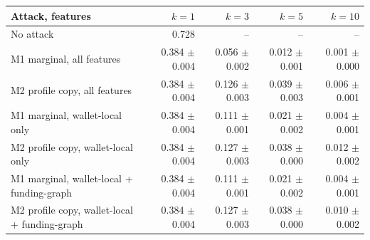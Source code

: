 \begin{tabular}{lrrrr}
\toprule
Attack, features & $k=1$ & $k=3$ & $k=5$ & $k=10$ \\
\midrule
No attack & 0.728 & -- & -- & -- \\
M1 marginal, all features & 0.384 $\pm$ 0.004 & 0.056 $\pm$ 0.002 & 0.012 $\pm$ 0.001 & 0.001 $\pm$ 0.000 \\
M2 profile copy, all features & 0.384 $\pm$ 0.004 & 0.126 $\pm$ 0.003 & 0.039 $\pm$ 0.003 & 0.006 $\pm$ 0.001 \\
M1 marginal, wallet-local only & 0.384 $\pm$ 0.004 & 0.111 $\pm$ 0.001 & 0.021 $\pm$ 0.002 & 0.004 $\pm$ 0.001 \\
M2 profile copy, wallet-local only & 0.384 $\pm$ 0.004 & 0.127 $\pm$ 0.003 & 0.038 $\pm$ 0.000 & 0.012 $\pm$ 0.002 \\
M1 marginal, wallet-local + funding-graph & 0.384 $\pm$ 0.004 & 0.111 $\pm$ 0.001 & 0.021 $\pm$ 0.002 & 0.004 $\pm$ 0.001 \\
M2 profile copy, wallet-local + funding-graph & 0.384 $\pm$ 0.004 & 0.127 $\pm$ 0.003 & 0.038 $\pm$ 0.000 & 0.010 $\pm$ 0.002 \\
\bottomrule
\end{tabular}
